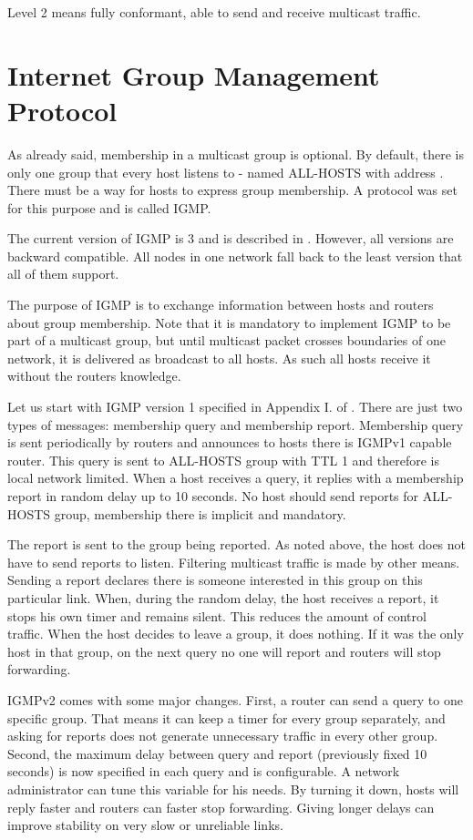 Level 2 means fully conformant, able to send and receive multicast traffic.

\section{Internet Group Management Protocol}

As already said, membership in a multicast group is optional. By default, there
is only one group that every host listens to - named ALL-HOSTS with address
. There must be a way for hosts to express group membership.
A protocol was set for this purpose and is called IGMP.

The current version of IGMP is 3 and is described in . However, all
versions are backward compatible. All nodes in one network fall back to the
least version that all of them support.

The purpose of IGMP is to exchange information between hosts and routers about
group membership. Note that it is mandatory to implement IGMP to be part of
a multicast group, but until multicast packet crosses boundaries of one network, it
is delivered as broadcast to all hosts. As such all hosts receive it without
the routers knowledge.

Let us start with IGMP version 1 specified in Appendix I. of . There
are just two types of messages: membership query and membership report.
Membership query is sent periodically by routers and announces to hosts there
is IGMPv1 capable router. This query is sent to ALL-HOSTS group with TTL 1 and
therefore is local network limited. When a host receives a query, it replies with
a membership report in random delay up to 10 seconds. No host should send
reports for ALL-HOSTS group, membership there is implicit and mandatory.

The report is sent to the group being reported. As noted above, the host does not have
to send reports to listen. Filtering multicast traffic is made by other means.
Sending a report declares there is someone interested in this group on this
particular link. When, during the random delay, the host receives a report, it
stops his own timer and remains silent. This reduces the amount of control
traffic. When the host decides to leave a group, it does nothing. If it was the
only host in that group, on the next query no one will report and routers will
stop forwarding.

IGMPv2 \cite{rfc2236} comes with some major changes. First, a router can send
a query to one specific group. That means it can keep a timer for every group
separately, and asking for reports does not generate unnecessary traffic in
every other group. Second, the maximum delay between query and report
(previously fixed 10 seconds) is now specified in each query and is
configurable. A network administrator can tune this variable for his needs. By
turning it down, hosts will reply faster and routers can faster stop
forwarding. Giving longer delays can improve stability on very slow or
unreliable links.

